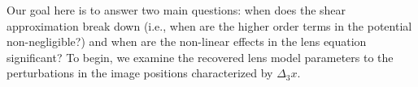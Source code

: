 Our goal here is to answer two main questions: when does the shear approximation break down (i.e., when are the higher order terms in the potential non-negligible?) and when are the non-linear effects in the lens equation significant?
To begin, we examine the recovered lens model parameters to the perturbations in the image positions characterized by $\Delta_3 x$.